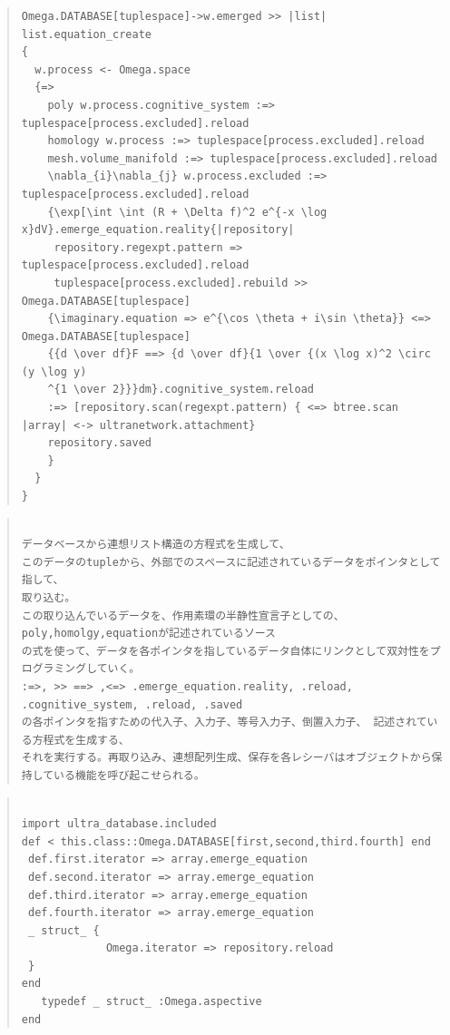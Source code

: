 \documentclass{jsarticle}
\begin{document}
{\begin{quote}
\begin{verbatim}
Omega.DATABASE[tuplespace]->w.emerged >> |list| list.equation_create
{
  w.process <- Omega.space
  {=>
    poly w.process.cognitive_system :=> tuplespace[process.excluded].reload
    homology w.process :=> tuplespace[process.excluded].reload
    mesh.volume_manifold :=> tuplespace[process.excluded].reload
    \nabla_{i}\nabla_{j} w.process.excluded :=> tuplespace[process.excluded].reload
    {\exp[\int \int (R + \Delta f)^2 e^{-x \log x}dV}.emerge_equation.reality{|repository|
     repository.regexpt.pattern => tuplespace[process.excluded].reload
     tuplespace[process.excluded].rebuild >> Omega.DATABASE[tuplespace]
    {\imaginary.equation => e^{\cos \theta + i\sin \theta}} <=> Omega.DATABASE[tuplespace]
    {{d \over df}F ==> {d \over df}{1 \over {(x \log x)^2 \circ (y \log y)
    ^{1 \over 2}}}dm}.cognitive_system.reload 
    :=> [repository.scan(regexpt.pattern) { <=> btree.scan |array| <-> ultranetwork.attachment}
    repository.saved
    }
  }
}
\end{verbatim}
\end{quote}

\begin{quote}
\setlength{\baselineskip}{12pt}
\begin{verbatim}

データベースから連想リスト構造の方程式を生成して、
このデータのtupleから、外部でのスペースに記述されているデータをポインタとして指して、
取り込む。
この取り込んでいるデータを、作用素環の半静性宣言子としての、poly,homolgy,equationが記述されているソース
の式を使って、データを各ポインタを指しているデータ自体にリンクとして双対性をプログラミングしていく。
:=>, >> ==> ,<=> .emerge_equation.reality, .reload, .cognitive_system, .reload, .saved
の各ポインタを指すための代入子、入力子、等号入力子、倒置入力子、 記述されている方程式を生成する、
それを実行する。再取り込み、連想配列生成、保存を各レシーバはオブジェクトから保持している機能を呼び起こせられる。
 \end{verbatim}
\end{quote}

   
\begin{quote}
\setlength{\baselineskip}{12pt}
\begin{verbatim}

import ultra_database.included
def < this.class::Omega.DATABASE[first,second,third.fourth] end
 def.first.iterator => array.emerge_equation
 def.second.iterator => array.emerge_equation
 def.third.iterator => array.emerge_equation
 def.fourth.iterator => array.emerge_equation
 _ struct_ {
             Omega.iterator => repository.reload
 } 
end
   typedef _ struct_ :Omega.aspective
end
 \end{verbatim}
\end{quote}

}
\end{document}
